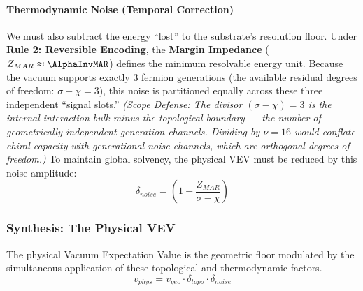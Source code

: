 \paragraph{Thermodynamic Noise (Temporal Correction)}
We must also subtract the energy ``lost'' to the substrate's resolution floor. Under \textbf{Rule 2: Reversible Encoding}, the \textbf{Margin Impedance} ($Z_{MAR} \approx \AlphaInvMAR$) defines the minimum resolvable energy unit. Because the vacuum supports exactly 3 fermion generations (the available residual degrees of freedom: $\sigma - \chi = 3$), this noise is partitioned equally across these three independent ``signal slots.'' \textit{(Scope Defense: The divisor $(\sigma-\chi) = 3$ is the internal interaction bulk minus the topological boundary — the number of geometrically independent generation channels. Dividing by $\nu=16$ would conflate chiral capacity with generational noise channels, which are orthogonal degrees of freedom.)} To maintain global solvency, the physical VEV must be reduced by this noise amplitude:
\begin{equation}
\delta_{noise} = \left( 1 - \frac{Z_{MAR}}{\sigma - \chi} \right)
\end{equation}

\subsubsection{Synthesis: The Physical VEV}
The physical Vacuum Expectation Value is the geometric floor modulated by the simultaneous application of these topological and thermodynamic factors.
\begin{equation}
v_{phys} = v_{geo} \cdot \delta_{topo} \cdot \delta_{noise}
\end{equation}

